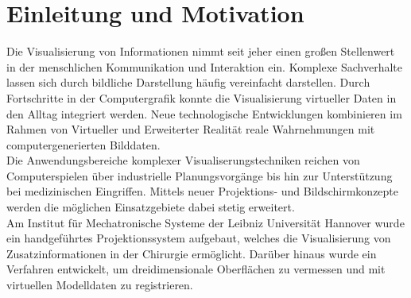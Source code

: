 \chapter{Einleitung und Motivation}

\prever{
}

Die Visualisierung von Informationen nimmt seit jeher einen großen Stellenwert in der menschlichen Kommunikation und Interaktion ein. Komplexe Sachverhalte lassen sich durch bildliche Darstellung häufig vereinfacht darstellen. Durch Fortschritte in der Computergrafik konnte die Visualisierung virtueller Daten in den Alltag integriert werden. Neue technologische Entwicklungen kombinieren im Rahmen von Virtueller und Erweiterter Realität reale Wahrnehmungen mit computergenerierten Bilddaten.\\

Die Anwendungsbereiche komplexer Visualiserungstechniken reichen von Computerspielen über industrielle Planungsvorgänge bis hin zur Unterstützung bei medizinischen Eingriffen. Mittels neuer Projektions- und Bildschirmkonzepte werden die möglichen Einsatzgebiete dabei stetig erweitert.\\
Am Institut für Mechatronische Systeme der Leibniz Universität Hannover wurde ein handgeführtes Projektionssystem aufgebaut, welches die Visualisierung von Zusatzinformationen in der Chirurgie ermöglicht. Darüber hinaus wurde ein Verfahren entwickelt, um dreidimensionale Oberflächen zu vermessen und mit virtuellen Modelldaten zu registrieren.\\

